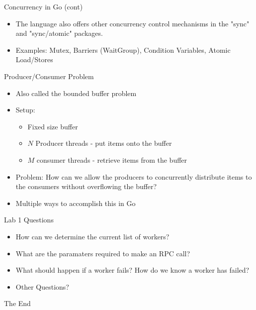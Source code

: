 \documentclass[svgnames]{beamer}
\begin{document}
\begin{frame}{Concurrency in Go (cont)}
\begin{itemize}
	\item The language also offers other concurrency control mechanisms in the "sync" and "sync/atomic" packages.
	\item Examples: Mutex, Barriers (WaitGroup), Condition Variables, Atomic Load/Stores
\end{itemize}
\end{frame}

\begin{frame}{Producer/Consumer Problem}
\begin{itemize}
	\item Also called the bounded buffer problem
	\item Setup:
		\begin{itemize}
			\item Fixed size buffer
			\item $N$ Producer threads - put items onto the buffer
			\item $M$ consumer threads - retrieve items from the buffer
		\end{itemize}
	\item Problem: How can we allow the producers to concurrently distribute items to the consumers without overflowing the buffer?
	\item Multiple ways to accomplish this in Go
\end{itemize}
\end{frame}

\begin{frame}{Lab 1 Questions}
\begin{itemize}
	\item How can we determine the current list of workers?
	\item What are the paramaters required to make an RPC call?
	\item What should happen if a worker fails? How do we know a worker has failed?
	\item Other Questions?
\end{itemize}
\end{frame}


\begin{frame}
\Huge{\centerline{The End}}
\end{frame}
\end{document}
